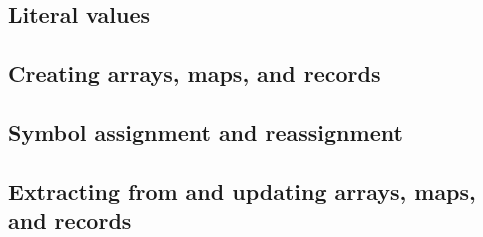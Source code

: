 \documentclass{article}
\theoremstyle{definition}
\begin{document}
\subsection{Literal values}



\subsection{Creating arrays, maps, and records}


\subsection{Symbol assignment and reassignment}


\subsection{Extracting from and updating arrays, maps, and records}

\end{document}
